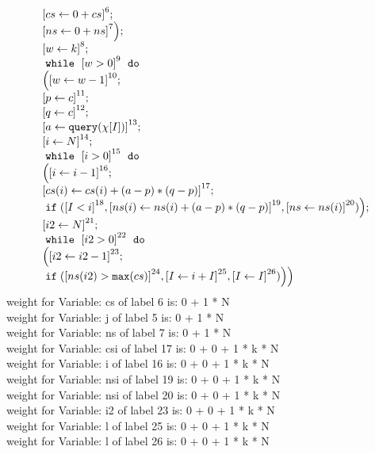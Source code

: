 \begin{example}
\[\begin{array}{l}
     \clabel{\assign{cs}{0 + cs}}^6; \\
     \clabel{\assign{ns}{0 + ns}}^7
     \Big); \\
     \clabel{\assign{w}{k}}^{8} ;\\
     \ewhile ~ \clabel{w > 0}^{9} ~ \edo ~ \\
    \Big(
    \clabel{\assign{w}{w-1}}^{10} ;\\
    \left[p \leftarrow c \right]^{11}; \\
    \left[q \leftarrow c \right]^{12}; \\
    \left[ a \leftarrow \query (\chi[I]) \right]^{13};\\
    \clabel{\assign{i}{N}}^{14} ; \\
    \ewhile ~ \clabel{i > 0}^{15} ~ \edo ~ \\
    \Big(
    \clabel{\assign{i}{i-1}}^{16} ;\\
    \clabel{\assign{cs(i)}{cs(i) + (a - p) * (q - p)}}^{17}; \\
    \eif (\clabel{ I < i}^{18}, \clabel{\assign{ns(i)}{{ns(i) + (a - p) * (q - p)}}}^{19},
    \clabel{\assign{ns}{ns(i)}}^{20}    )
    \Big); \\
    \clabel{\assign{i2}{N}}^{21} ; \\
    \ewhile ~ \clabel{i2 > 0}^{22} ~ \edo ~ \\
    \Big(
    \clabel{\assign{i2}{i2-1}}^{23} ;\\
    \eif (\clabel{ns(i2) > \kw{max}(cs)}^{24}, 
    \clabel{\assign{I}{i + I}}^{25},
    \clabel{\assign{I}{I}}^{26})
    \Big)
    \Big) 
\end{array}
\]
weight for Variable: cs of label 6 is: 0 + 1 * N \\
weight for Variable: j of label 5 is: 0 + 1 * N \\
weight for Variable: ns of label 7 is: 0 + 1 * N \\
weight for Variable: csi of label 17 is: 0 + 0 + 1 * k * N \\
weight for Variable: i of label 16 is: 0 + 0 + 1 * k * N \\
weight for Variable: nsi of label 19 is: 0 + 0 + 1 * k * N \\
weight for Variable: nsi of label 20 is: 0 + 0 + 1 * k * N \\
weight for Variable: i2 of label 23 is: 0 + 0 + 1 * k * N \\
weight for Variable: l of label 25 is: 0 + 0 + 1 * k * N \\
weight for Variable: l of label 26 is: 0 + 0 + 1 * k * N \\

\end{example}
